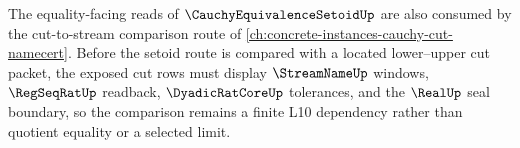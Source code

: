 The equality-facing reads of $\CauchyEquivalenceSetoidUp$ are also consumed by the cut-to-stream comparison route of \autoref{ch:concrete-instances-cauchy-cut-namecert}. Before the setoid route is compared with a located lower--upper cut packet, the exposed cut rows must display $\StreamNameUp$ windows, $\RegSeqRatUp$ readback, $\DyadicRatCoreUp$ tolerances, and the $\RealUp$ seal boundary, so the comparison remains a finite L10 dependency rather than quotient equality or a selected limit.
